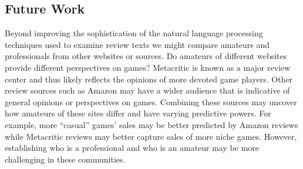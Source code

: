 \documentclass[letterpaper]{article}
\begin{document}
\subsection{Future Work}
Beyond improving the sophistication of the
natural language processing techniques used to examine review texts we
might compare amateurs and professionals from other websites or sources.
Do amateurs of different websites provide different perspectives on
games? Metacritic is known as a major review center and thus likely
reflects the opinions of more devoted game players. Other review sources
such as Amazon may have a wider audience that is indicative of general
opinions or perspectives on games. Combining these sources may uncover
how amateurs of these sites differ and have varying predictive powers.
For example, more ``casual'' games' sales may be better predicted by
Amazon reviews while Metacritic reviews may better capture sales of more
niche games. However, establishing who is a professional and who is an
amateur may be more challenging in these communities.


\end{document}
